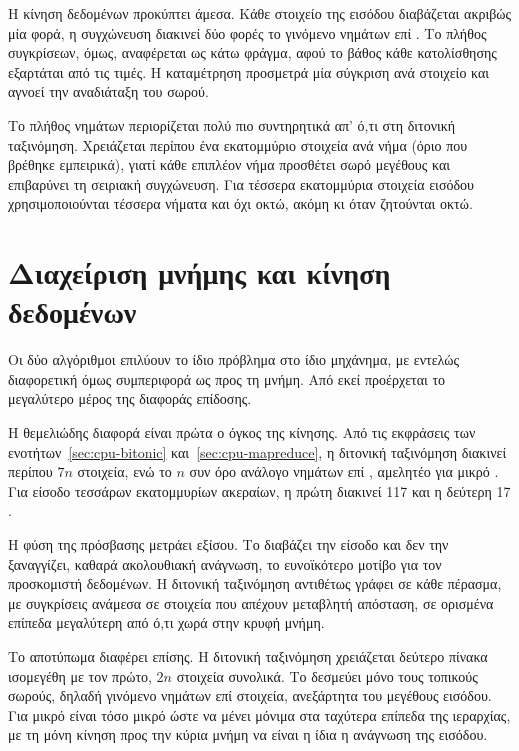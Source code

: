 Η κίνηση δεδομένων προκύπτει άμεσα. Κάθε στοιχείο της εισόδου διαβάζεται
ακριβώς μία φορά, η συγχώνευση διακινεί δύο φορές το γινόμενο νημάτων επί
. Το πλήθος συγκρίσεων, όμως, αναφέρεται ως κάτω φράγμα, αφού το βάθος
κάθε κατολίσθησης εξαρτάται από τις τιμές. Η καταμέτρηση προσμετρά μία σύγκριση
ανά στοιχείο και αγνοεί την αναδιάταξη του σωρού.

Το πλήθος νημάτων περιορίζεται πολύ πιο συντηρητικά απ' ό,τι στη διτονική
ταξινόμηση. Χρειάζεται περίπου ένα εκατομμύριο στοιχεία ανά νήμα (όριο που
βρέθηκε εμπειρικά), γιατί κάθε επιπλέον νήμα προσθέτει σωρό μεγέθους  και
επιβαρύνει τη σειριακή συγχώνευση. Για τέσσερα εκατομμύρια στοιχεία εισόδου
χρησιμοποιούνται τέσσερα νήματα και όχι οκτώ, ακόμη κι όταν ζητούνται οκτώ.

\section{Διαχείριση μνήμης και κίνηση δεδομένων}
\label{sec:cpu-memory}

Οι δύο αλγόριθμοι επιλύουν το ίδιο πρόβλημα στο ίδιο μηχάνημα, με εντελώς
διαφορετική όμως συμπεριφορά ως προς τη μνήμη. Από εκεί προέρχεται το
μεγαλύτερο μέρος της διαφοράς επίδοσης.

Η θεμελιώδης διαφορά είναι πρώτα ο όγκος της κίνησης. Από τις εκφράσεις των
ενοτήτων~\ref{sec:cpu-bitonic} και~\ref{sec:cpu-mapreduce}, η διτονική
ταξινόμηση διακινεί περίπου $7n$ στοιχεία, ενώ το  $n$ συν όρο
ανάλογο νημάτων επί , αμελητέο για μικρό . Για είσοδο τεσσάρων
εκατομμυρίων ακεραίων, η πρώτη διακινεί 117  και η δεύτερη 17 .

Η φύση της πρόσβασης μετράει εξίσου. Το  διαβάζει την είσοδο και
δεν την ξαναγγίζει, καθαρά ακολουθιακή ανάγνωση, το ευνοϊκότερο μοτίβο για τον
προσκομιστή δεδομένων. Η διτονική ταξινόμηση αντιθέτως γράφει σε κάθε πέρασμα,
με συγκρίσεις ανάμεσα σε στοιχεία που απέχουν μεταβλητή απόσταση, σε ορισμένα
επίπεδα μεγαλύτερη από ό,τι χωρά στην κρυφή μνήμη.

Το αποτύπωμα διαφέρει επίσης. Η διτονική ταξινόμηση χρειάζεται δεύτερο πίνακα
ισομεγέθη με τον πρώτο, $2n$ στοιχεία συνολικά. Το  δεσμεύει
μόνο τους τοπικούς σωρούς, δηλαδή γινόμενο νημάτων επί  στοιχεία,
ανεξάρτητα του μεγέθους εισόδου. Για μικρό  είναι τόσο μικρό ώστε να
μένει μόνιμα στα ταχύτερα επίπεδα της ιεραρχίας, με τη μόνη κίνηση προς την
κύρια μνήμη να είναι η ίδια η ανάγνωση της εισόδου.


